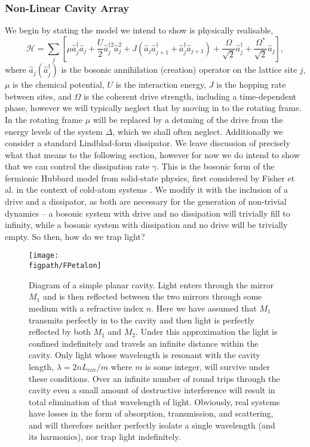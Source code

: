 \subsubsection{Non-Linear Cavity Array}
We begin by stating the model we intend to show is physically realisable,
\begin{equation}
	\mathcal{H} = \sum_{j} \left[\mu\hat{a}_{j}^{\dagger}\hat{a}_{j} + \frac{U}{2}\hat{a}_{j}^{\dagger 2}\hat{a}_{j}^{2} + J(\hat{a}_{j}\hat{a}_{j+1}^{\dagger} + \hat{a}_{j}^{\dagger}\hat{a}_{j+1}) + \frac{\Omega}{\sqrt{2}}\hat{a}_{j}^{\dagger} + \frac{\Omega^{*}}{\sqrt{2}}\hat{a}_{j} \right],
	\label{eq:mbq2-1}
\end{equation}
where \(\hat{a}_{j} (\hat{a}_{j}^{\dagger})\) is the bosonic annihilation (creation) operator on the lattice site \(j\), \(\mu\) is the chemical potential, \(U\) is the interaction energy, \(J\) is the hopping rate between sites, and \(\Omega\) is the coherent drive strength, including a time-dependent phase, however we will typically neglect that by moving in to the rotating frame. In the rotating frame \(\mu\) will be replaced by a detuning of the drive from the energy levels of the system \(\Delta\), which we shall often neglect. Additionally we consider a standard Lindblad-form dissipator. We leave discussion of precisely what that means to the following section, however for now we do intend to show that we can control the dissipation rate \(\gamma\). This is the bosonic form of the fermionic Hubbard model \cite{Hubbard63} from solid-state physics, first considered by Fisher et al. in the context of cold-atom systems \cite{FWGF89,HBP08}. We modify it with the inclusion of a drive and a dissipator, as both are necessary for the generation of non-trivial dynamics -- a bosonic system with drive and no dissipation will trivially fill to infinity, while a bosonic system with dissipation and no drive will be trivially empty. So then, how do we trap light?

\begin{figure}[ht!]
\centering
\texttt{[image: \\figpath/FPetalon]}
\caption{Diagram of a simple planar cavity. Light enters through the mirror \(M_{1}\) and is then reflected between the two mirrors through some medium with a refractive index \(n\). Here we have assumed that \(M_{1}\) transmits perfectly in to the cavity and then light is perfectly reflected by both \(M_{1}\) and \(M_{2}\). Under this approximation the light is confined indefinitely and travels an infinite distance within the cavity. Only light whose wavelength is resonant with the cavity length, \(\lambda = 2nL_{\mathrm{cav}} / m\) where \(m\) is some integer, will survive under these conditions. Over an infinite number of round trips through the cavity even a small amount of destructive interference will result in total elimination of that wavelength of light. Obviously, real systems have losses in the form of absorption, transmission, and scattering, and will therefore neither perfectly isolate a single wavelength (and its harmonics), nor trap light indefinitely.}
\label{fig:mbq2-1}
\end{figure}

